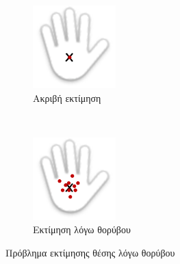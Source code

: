 \begin{figure}[h]
    \centering
    \begin{subfigure}[b]{.4\textwidth}
        \includegraphics[width=\textwidth]{kinect/fig/hand1.png}
        \caption{Ακριβή εκτίμηση}
        \label{fig:hand1}
    \end{subfigure} ~
    \begin{subfigure}[b]{.4\textwidth}
        \includegraphics[width=\textwidth]{kinect/fig/hand2.png}
        \caption{Εκτίμηση λόγω θορύβου}
        \label{fig:hand2}
    \end{subfigure}
    \caption{Πρόβλημα εκτίμησης θέσης λόγω θορύβου\protect\footnotemark}
\end{figure}

